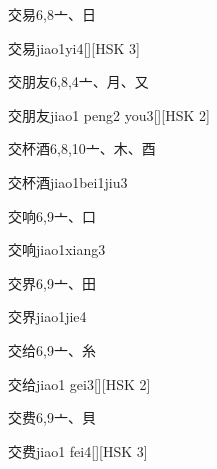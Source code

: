 \begin{entry}{交易}{6,8}{⼇、⽇}
  \begin{phonetics}{交易}{jiao1yi4}[][HSK 3]
  \end{phonetics}
\end{entry}

\begin{entry}{交朋友}{6,8,4}{⼇、⽉、⼜}
  \begin{phonetics}{交朋友}{jiao1 peng2 you3}[][HSK 2]
  \end{phonetics}
\end{entry}

\begin{entry}{交杯酒}{6,8,10}{⼇、⽊、⾣}
  \begin{phonetics}{交杯酒}{jiao1bei1jiu3}
  \end{phonetics}
\end{entry}

\begin{entry}{交响}{6,9}{⼇、⼝}
  \begin{phonetics}{交响}{jiao1xiang3}
  \end{phonetics}
\end{entry}

\begin{entry}{交界}{6,9}{⼇、⽥}
  \begin{phonetics}{交界}{jiao1jie4}
  \end{phonetics}
\end{entry}

\begin{entry}{交给}{6,9}{⼇、⽷}
  \begin{phonetics}{交给}{jiao1 gei3}[][HSK 2]
  \end{phonetics}
\end{entry}

\begin{entry}{交费}{6,9}{⼇、⾙}
  \begin{phonetics}{交费}{jiao1 fei4}[][HSK 3]
  \end{phonetics}
\end{entry}

